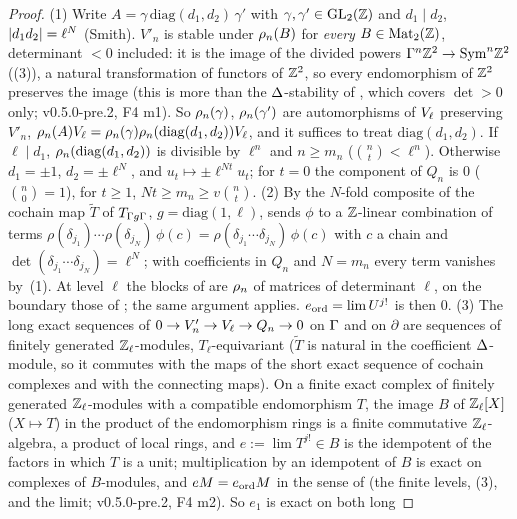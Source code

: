 \documentclass[11pt]{article}
\newcommand{\Zl}{\Z_\ell}
\begin{document}
\begin{proof}
(1) Write $A=\gamma\,\mathrm{diag}(d_1,d_2)\,\gamma'$ with $\gamma,\gamma'\in\mathrm{GL}_2(\mathbb{Z})$ and $d_1\mid d_2$, $\left| d_1d_2 \right|=\ell^{N}$ (Smith). $V'_n$ is stable under $\rho_n(B)$ for
\emph{every} $B\in\mathrm{Mat}_2(\mathbb{Z})$, determinant $<0$ included: it is the image of the divided powers $\Gamma^{n}\mathbb{Z}^{2}\to\mathrm{Sym}^{n}\mathbb{Z}^{2}$ ((3)), a natural
transformation of functors of $\mathbb{Z}^{2}$, so every endomorphism of $\mathbb{Z}^{2}$ preserves the image (this is more than the $\Delta$-stability of , which covers
$\det>0$ only; v0.5.0-pre.2, F4 m1). So $\rho_n(\gamma)$, $\rho_n(\gamma')$ are automorphisms of $V_\ell$ preserving $V'_n$, $\rho_n(A)V_\ell=\rho_n(\gamma)\rho_n(\mathrm{diag}(d_1,d_2))V_\ell$,
and it suffices to treat $\mathrm{diag}(d_1,d_2)$. If $\ell\mid d_1$, $\rho_n(\mathrm{diag}(d_1,d_2))$ is
divisible by $\ell^{n}$ and $n\ge m_n$ ($\binom nt<\ell^{n}$). Otherwise $d_1=\pm1$, $d_2=\pm\ell^{N}$, and $u_t\mapsto\pm\ell^{Nt}u_t$; for $t=0$ the component of $Q_n$ is $0$
($\binom n0=1$), for $t\ge1$, $Nt\ge m_n\ge v\binom nt$. (2) By  the $N$-fold composite of the cochain map $\widetilde T$ of $T_{\Gamma g \Gamma}$, $g=\mathrm{diag}(1,\ell)$,
sends $\phi$ to a $\mathbb{Z}$-linear combination of terms $\rho(\delta_{j_1})\cdots\rho(\delta_{j_N})\,\phi(c)=\rho(\delta_{j_1}\cdots\delta_{j_N})\,\phi(c)$ with $c$ a chain and
$\det(\delta_{j_1}\cdots\delta_{j_N})=\ell^{N}$; with coefficients in $Q_n$ and $N=m_n$ every term vanishes by~(1). At level $\ell$ the blocks of  are
$\rho_n$ of matrices of determinant $\ell$, on the boundary those of ; the same argument applies. $e_{\mathrm{ord}}=\lim U^{j!}$ is then $0$. (3) The long exact sequences of
$0\to V'_n\to V_\ell\to Q_n\to0$ on $\Gamma$ and on $\partial$ are sequences of finitely generated $\Zl$-modules, $T_\ell$-equivariant ($\widetilde T$ is natural in the coefficient
$\Delta$-module, so it commutes with the maps of the short exact sequence of cochain complexes and with the connecting maps). On a finite exact complex of finitely generated
$\Zl$-modules with a compatible endomorphism $T$, the image $B$ of $\Zl[X]$ ($X\mapsto T$) in the product of the endomorphism rings is a finite commutative $\Zl$-algebra, a
product of local rings, and $e:=\lim T^{j!}\in B$ is the idempotent of the factors in which $T$ is a unit; multiplication by an idempotent of $B$ is exact on complexes of
$B$-modules, and $eM=e_{\mathrm{ord}} M$ in the sense of  (the finite levels, (3), and the limit; v0.5.0-pre.2, F4 m2). So $e_1$ is exact on both long

\end{proof}
\end{document}
